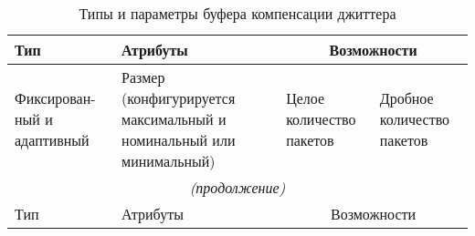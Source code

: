 \begin{longtable}{|p{3cm}||p{4cm}|p{4cm}|p{3.5cm}|}
\caption{Типы и параметры буфера компенсации джиттера}\label{TypeBuff}
    \hline
    Тип         & Атрибуты    & \multicolumn{2}{c|}{Возможности}  \\ \hline 
    Фиксирован-ный и адаптивный & Размер (конфигурируется максимальный и номинальный или минимальный) & Целое количество пакетов                                                     & Дробное количество пакетов         \\  \hline \hline
    \endfirsthead   \hline
 \multicolumn{4}{|c|}{\small\slshape (продолжение)}        \\ \hline
 Тип                        & Атрибуты                                                            & \multicolumn{2}{c|}{Возможности}     \\ \hline 
        

\end{longtable}
